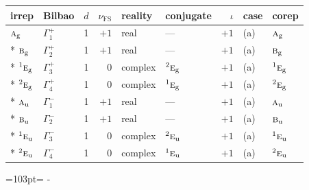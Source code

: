\documentclass[10pt,a4paper]{article}
\newcommand{\needspace}[1]{\par\penalty-100\begingroup\dimen0=#1\relax\dimen2=\pagegoal
  \advance\dimen2-\pagetotal\ifdim\dimen0>\dimen2\relax\ifdim\dimen2>0pt\vfil\break\fi\fi
  \endgroup}
\numberwithin{equation}{section}
\newcommand{\irr}[1]{\text{\normalfont\scshape #1}}
\newcommand{\conjpair}[1]{{}^{#1}}
\newcommand{\ptag}[1]{\mathrm{#1}}
\newcommand{\fsind}{\nu_{\mathrm{FS}}}
\begin{document}
{\small\renewcommand{\arraystretch}{1.25}\setlength{\tabcolsep}{4pt}\begin{longtable}{@{}llrrllrll@{}}\toprule
irrep & Bilbao & $d$ & $\fsind$ & reality & conjugate & $\iota$ & case & corep\\\midrule\endhead
\bottomrule\endfoot\endlastfoot
$\irr{a}_{\ptag{g}}$ & $\Gamma_{1}^{+}$ & 1 & $+1$ & real & --- & $+1$ & (a) & $\irr{a}_{\ptag{g}}$\\*
$\irr{b}_{\ptag{g}}$ & $\Gamma_{2}^{+}$ & 1 & $+1$ & real & --- & $+1$ & (a) & $\irr{b}_{\ptag{g}}$\\*
$\conjpair{1}\irr{e}_{\ptag{g}}$ & $\Gamma_{3}^{+}$ & 1 & $0$ & complex & $\conjpair{2}\irr{e}_{\ptag{g}}$ & $+1$ & (a) & $\conjpair{1}\irr{e}_{\ptag{g}}$\\*
$\conjpair{2}\irr{e}_{\ptag{g}}$ & $\Gamma_{4}^{+}$ & 1 & $0$ & complex & $\conjpair{1}\irr{e}_{\ptag{g}}$ & $+1$ & (a) & $\conjpair{2}\irr{e}_{\ptag{g}}$\\*
$\irr{a}_{\ptag{u}}$ & $\Gamma_{1}^{-}$ & 1 & $+1$ & real & --- & $+1$ & (a) & $\irr{a}_{\ptag{u}}$\\*
$\irr{b}_{\ptag{u}}$ & $\Gamma_{2}^{-}$ & 1 & $+1$ & real & --- & $+1$ & (a) & $\irr{b}_{\ptag{u}}$\\*
$\conjpair{1}\irr{e}_{\ptag{u}}$ & $\Gamma_{3}^{-}$ & 1 & $0$ & complex & $\conjpair{2}\irr{e}_{\ptag{u}}$ & $+1$ & (a) & $\conjpair{1}\irr{e}_{\ptag{u}}$\\*
$\conjpair{2}\irr{e}_{\ptag{u}}$ & $\Gamma_{4}^{-}$ & 1 & $0$ & complex & $\conjpair{1}\irr{e}_{\ptag{u}}$ & $+1$ & (a) & $\conjpair{2}\irr{e}_{\ptag{u}}$\\
\bottomrule\end{longtable}}
\needspace{103pt}
\end{document}
